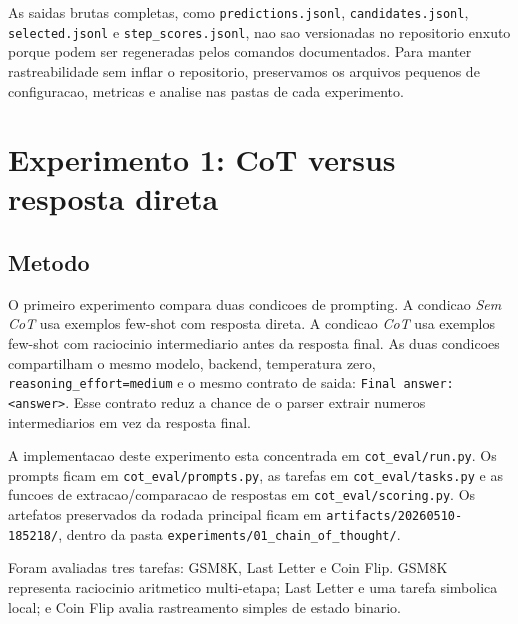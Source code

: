 \documentclass[a4paper,12pt]{article}
\begin{document}
As saidas brutas completas, como \texttt{predictions.jsonl},
\texttt{candidates.jsonl}, \texttt{selected.jsonl} e
\texttt{step\_scores.jsonl}, nao sao versionadas no repositorio enxuto porque
podem ser regeneradas pelos comandos documentados. Para manter rastreabilidade
sem inflar o repositorio, preservamos os arquivos pequenos de configuracao,
metricas e analise nas pastas de cada experimento.

\section{Experimento 1: CoT versus resposta direta}

\subsection{Metodo}

O primeiro experimento compara duas condicoes de prompting. A condicao
\emph{Sem CoT} usa exemplos few-shot com resposta direta. A condicao
\emph{CoT} usa exemplos few-shot com raciocinio intermediario antes da resposta
final. As duas condicoes compartilham o mesmo modelo, backend, temperatura
zero, \texttt{reasoning\_effort=medium} e o mesmo contrato de saida:
\texttt{Final answer: <answer>}. Esse contrato reduz a chance de o parser
extrair numeros intermediarios em vez da resposta final.

A implementacao deste experimento esta concentrada em \texttt{cot\_eval/run.py}.
Os prompts ficam em \texttt{cot\_eval/prompts.py}, as tarefas em
\texttt{cot\_eval/tasks.py} e as funcoes de extracao/comparacao de respostas em
\texttt{cot\_eval/scoring.py}. Os artefatos preservados da rodada principal
ficam em \texttt{artifacts/20260510-185218/}, dentro da pasta
\texttt{experiments/01\_chain\_of\_thought/}.

Foram avaliadas tres tarefas: GSM8K, Last Letter e Coin Flip. GSM8K representa
raciocinio aritmetico multi-etapa; Last Letter e uma tarefa simbolica local; e
Coin Flip avalia rastreamento simples de estado binario.
\end{document}

